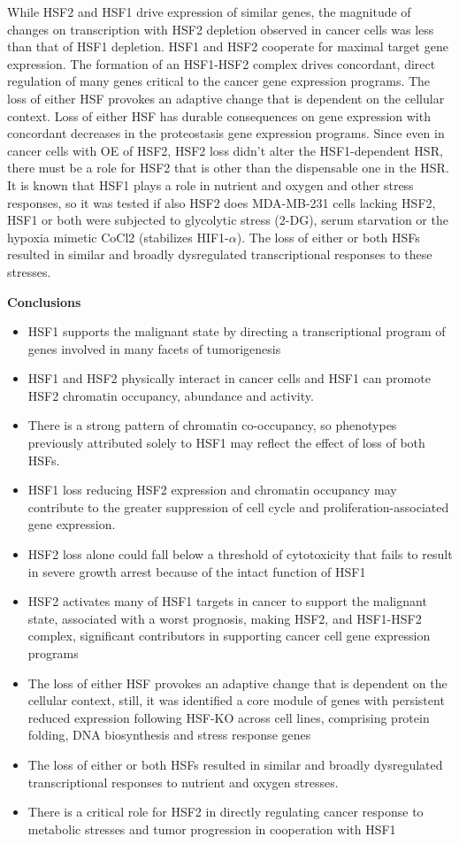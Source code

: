 While HSF2 and HSF1 drive expression of similar genes, the magnitude of changes on transcription with HSF2 depletion observed in cancer cells
was less than that of HSF1 depletion. HSF1 and HSF2 cooperate for maximal target gene expression. The formation of an HSF1-HSF2 complex drives concordant, direct regulation of many genes critical to the cancer gene expression programs.
The loss of either HSF provokes an adaptive change that is dependent on the cellular context. Loss of either HSF has durable consequences on gene expression with concordant decreases in the proteostasis gene expression programs. Since even in cancer cells with OE of HSF2, HSF2 loss didn’t alter the HSF1-dependent HSR, there must be a role for HSF2 that is other than the dispensable one in the HSR.
It is known that HSF1 plays a role in nutrient and oxygen and other stress responses, so it was tested if also HSF2 does MDA-MB-231 cells lacking HSF2, HSF1 or both were subjected to glycolytic stress (2-DG), serum starvation or the hypoxia mimetic CoCl2 (stabilizes HIF1-$\alpha$). The loss of either or both HSFs resulted in similar and broadly dysregulated transcriptional responses to these stresses.

\textbf{Conclusions}
\begin{itemize}
\item HSF1 supports the malignant state by directing a transcriptional program of genes involved in many facets of tumorigenesis
\item HSF1 and HSF2 physically interact in cancer cells and HSF1 can promote HSF2 chromatin occupancy, abundance
and activity.
\item There is a strong pattern of chromatin co-occupancy, so phenotypes previously attributed solely to HSF1 may
reflect the effect of loss of both HSFs.
\item HSF1 loss reducing HSF2 expression and chromatin occupancy may contribute to the greater suppression of cell
cycle and proliferation-associated gene expression.
\item HSF2 loss alone could fall below a threshold of cytotoxicity that fails to result in severe growth arrest because of the
intact function of HSF1
\item HSF2 activates many of HSF1 targets in cancer to support the malignant state, associated with a worst prognosis, making HSF2, and HSF1-HSF2 complex, significant contributors in supporting cancer cell gene expression programs
\item The loss of either HSF provokes an adaptive change that is dependent on the cellular context, still, it was identified a core module of genes
with persistent reduced expression following HSF-KO across cell lines, comprising protein folding, DNA biosynthesis and stress response genes
\item The loss of either or both HSFs resulted in similar and broadly dysregulated transcriptional
responses to nutrient and oxygen stresses.
\item There is a critical role for HSF2 in directly regulating cancer response to metabolic stresses and tumor progression in cooperation with HSF1
\end{itemize}


